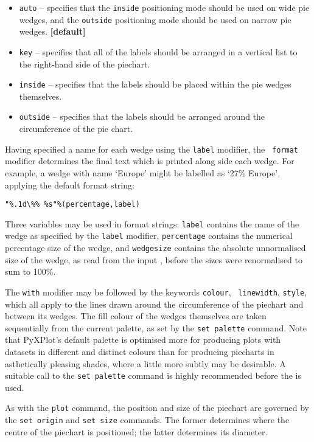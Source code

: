 \noindent
\begin{itemize}
\item {\tt auto} -- specifies that the {\tt inside} positioning mode should be used on wide pie wedges, and the {\tt outside} positioning mode should be used on narrow pie wedges. {\bf [default]}
\item {\tt key} -- specifies that all of the labels should be arranged in a vertical list to the right-hand side of the piechart.
\item {\tt inside} -- specifies that the labels should be placed within the pie wedges themselves.
\item {\tt outside} -- specifies that the labels should be arranged around the circumference of the pie chart.
\end{itemize}

Having specified a name for each wedge using the {\tt label} modifier, the {\tt
format} modifier determines the final text which is printed along side each
wedge.  For example, a wedge with name `Europe' might be labelled as `27\%
Europe', applying the default format string:
\begin{verbatim}
"%.1d\%% %s"%(percentage,label)
\end{verbatim}
Three variables may be used in format strings: {\tt label} contains the name of
the wedge as specified by the {\tt label} modifier, {\tt percentage} contains
the numerical percentage size of the wedge, and {\tt wedgesize} contains the
absolute unnormalised size of the wedge, as read from the input \datafile,
before the sizes were renormalised to sum to 100\%.

The {\tt with} modifier may be followed by the keywords {\tt colour}, {\tt
linewidth}, {\tt style}, which all apply to the lines drawn around the
circumference of the piechart and between its wedges. The fill colour of the
wedges themselves are taken sequentially from the current palette, as set by
the {\tt set palette} command. Note that PyXPlot's default palette is optimised
more for producing plots with datasets in different and distinct colours than
for producing piecharts in asthetically pleasing shades, where a little more
subtly may be desirable. A suitable call to the {\tt set palette} command is
highly recommended before the  is used.

As with the {\tt plot} command, the position and size of the piechart are
governed by the {\tt set origin} and {\tt set size} commands. The former
determines where the centre of the piechart is positioned; the latter
determines its diameter.

